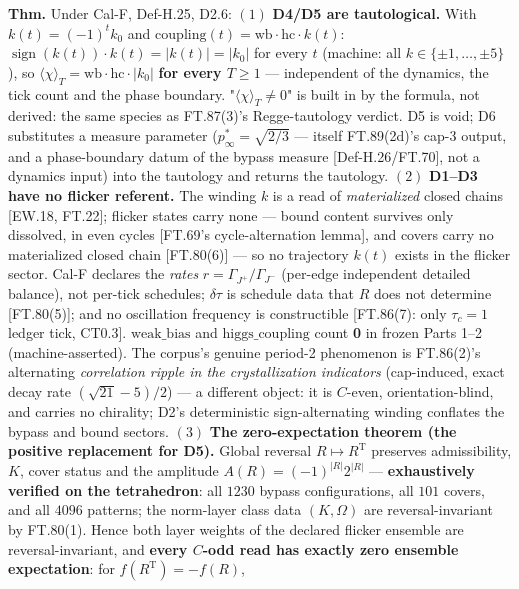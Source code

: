 \begin{theorem}\label{tag:FT-95}
\textbf{Thm.} Under Cal-F, Def-H.25, D2.6: $(1)$ \textbf{D4/D5 are tautological.} With $k(t)=(-1)^tk_0$ and $\mathrm{coupling}(t)=\mathrm{wb}\cdot\mathrm{hc}\cdot k(t)$: $\operatorname{sign}(k(t))\cdot k(t)=|k(t)|=|k_0|$ for every $t$ (machine: all $k\in\{\pm1,\dots,\pm5\}$), so $\langle\chi\rangle_T=\mathrm{wb}\cdot\mathrm{hc}\cdot|k_0|$ \textbf{for every $T\ge1$} — independent of the dynamics, the tick count and the phase boundary. "$\langle\chi\rangle_T\ne0$" is built in by the formula, not derived: the same species as FT.87(3)'s Regge-tautology verdict. D5 is void; D6 substitutes a measure parameter ($p^*_\infty=\sqrt{2/3}$ — itself FT.89(2d)'s cap-3 output, and a phase-boundary datum of the bypass measure [Def-H.26/FT.70], not a dynamics input) into the tautology and returns the tautology. $(2)$ \textbf{D1–D3 have no flicker referent.} The winding $k$ is a read of \textit{materialized} closed chains [EW.18, FT.22]; flicker states carry none — bound content survives only dissolved, in even cycles [FT.69's cycle-alternation lemma], and covers carry no materialized closed chain [FT.80(6)] — so no trajectory $k(t)$ exists in the flicker sector. Cal-F declares the \textit{rates} $r=\Gamma_{J^+}/\Gamma_{J^-}$ (per-edge independent detailed balance), not per-tick schedules; $\delta\tau$ is schedule data that $R$ does not determine [FT.80(5)]; and no oscillation frequency is constructible [FT.86(7): only $\tau_c=1$ ledger tick, CT0.3]. $\mathrm{weak\_bias}$ and $\mathrm{higgs\_coupling}$ count \textbf{0} in frozen Parts 1–2 (machine-asserted). The corpus's genuine period-2 phenomenon is FT.86(2)'s alternating \textit{correlation ripple in the crystallization indicators} (cap-induced, exact decay rate $(\sqrt{21}-5)/2$) — a different object: it is $C$-even, orientation-blind, and carries no chirality; D2's deterministic sign-alternating winding conflates the bypass and bound sectors. $(3)$ \textbf{The zero-expectation theorem (the positive replacement for D5).} Global reversal $R\mapsto R^{\mathrm T}$ preserves admissibility, $K$, cover status and the amplitude $A(R)=(-1)^{|R|}2^{|R|}$ — \textbf{exhaustively verified on the tetrahedron}: all $1230$ bypass configurations, all $101$ covers, and all $4096$ patterns; the norm-layer class data $(K,\Omega)$ are reversal-invariant by FT.80(1). Hence both layer weights of the declared flicker ensemble are reversal-invariant, and \textbf{every $C$-odd read has exactly zero ensemble expectation}: for $f(R^{\mathrm T})=-f(R)$,


\end{theorem}
